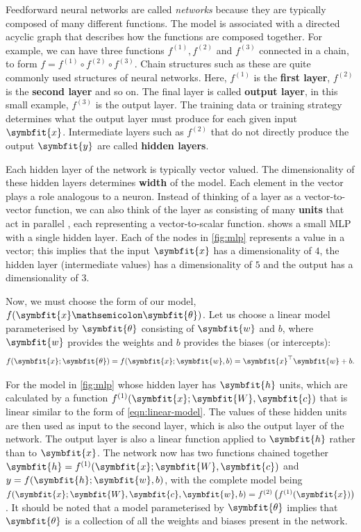 Feedforward neural networks are called \textit{networks} because they are typically composed of many different functions. The model is associated with a directed acyclic graph that describes how the functions are composed together.
For example, we can have three functions \(f^{(1)}, f^{(2)}\) and $f^{(3)}$ connected in a chain, to form \(f = f^{(1)} \circ f^{(2)} \circ f^{(3)}\). 
Chain structures such as these are quite commonly used structures of neural networks. Here, $f^{(1)}$ is the \textbf{first layer}, $f^{(2)}$ is the \textbf{second layer} and so on. 
The final layer is called \textbf{output layer}, in this small example, $f^{(3)}$ is the output layer. The training data or training strategy determines what the output layer must produce for each given input $\symbfit{x}$.
Intermediate layers such as $f^{(2)}$ that do not directly produce the output $\symbfit{y}$ are called \textbf{hidden layers}.

Each hidden layer of the network is typically vector valued. The dimensionality of these hidden layers determines \textbf{width} of the model. Each element in the vector plays a role analogous to a neuron. Instead of thinking of a layer as a vector-to-vector function, we can also think of the layer as consisting of many \textbf{units} that act in parallel \parencite{Pinker1988}, each representing a vector-to-scalar function. 
 shows a small MLP with a single hidden layer. Each of the nodes in \cref{fig:mlp} represents a value in a vector; this implies that the input $\symbfit{x}$ has a dimensionality of $4$, the hidden layer (intermediate values) has a dimensionality of $5$ and the output has a dimensionality of $3$.

Now, we must choose the form of our model, $f(\symbfit{x} \mathsemicolon \symbfit{\theta})$. Let us choose a linear model parameterised by $\symbfit{\theta}$ consisting of $\symbfit{w}$ and $b$, where $\symbfit{w}$ provides the weights and $b$ provides the biases (or intercepts):
\begin{equation}
    \label{eqn:linear-model}
    f(\symbfit{x}; \symbfit{\theta}) = f(\symbfit{x} ; \symbfit{w}, b)=\symbfit{x}^{\top} \symbfit{w} + b.
\end{equation}

For the model in \cref{fig:mlp} whose hidden layer has $\symbfit{h}$ units, which are calculated by a function \(f^{(1)}(\symbfit{x}; \symbfit{W}, \symbfit{c})\) that is linear similar to the form of \cref{eqn:linear-model}. 
The values of these hidden units are then used as input to the second layer, which is also the output layer of the network. The output layer is also a linear function applied to $\symbfit{h}$ rather than to $\symbfit{x}$.
The network now has two functions chained together \(\symbfit{h} = f^{(1)}(\symbfit{x}; \symbfit{W}, \symbfit{c})\) and \(y = f(\symbfit{h} ; \symbfit{w}, b)\), with the complete model being $f(\symbfit{x} ; \symbfit{W}, \symbfit{c}, \symbfit{w}, b)=f^{(2)}\left(f^{(1)}(\symbfit{x})\right)$. It should be noted that a model parameterised by $\symbfit{\theta}$ implies that $\symbfit{\theta}$ is a collection of all the weights and biases present in the network.

